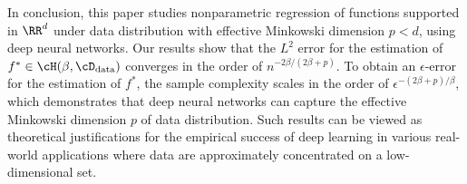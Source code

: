 In conclusion, this paper studies nonparametric regression of functions supported in $\RR^d$ under data distribution with effective Minkowski dimension $p<d$, using deep neural networks. Our results show that the $L^2$ error for the estimation of $f^* \in \cH(\beta,\cD_{\rm data})$ converges in the order of $n^{-2\beta/(2\beta+p)}$. To obtain an $\epsilon$-error for the estimation of $f^*$, the sample complexity scales in the order of $\epsilon^{-(2\beta+p)/\beta}$, which demonstrates that deep neural networks can capture the effective Minkowski dimension $p$ of data distribution. Such results can be viewed as theoretical justifications for the empirical success of deep learning in various real-world applications where data are approximately concentrated on a low-dimensional set.